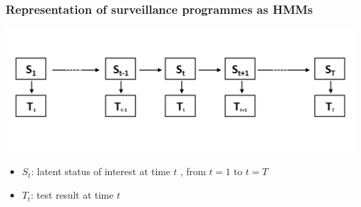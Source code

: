 \documentclass{beamer}
\begin{document}
\begin{frame}
\frametitle{Representation of surveillance programmes as HMMs}
\includegraphics[width = \textwidth]{imgs/surveillance_programmes_HMMs.png}
\begin{itemize}
 \item{$S_t$: latent status of interest at time $t$ , from $t=1$ to $t=T$}
 \item{$T_t$: test result at time $t$}
\end{itemize}
\end{frame}
\end{document}
